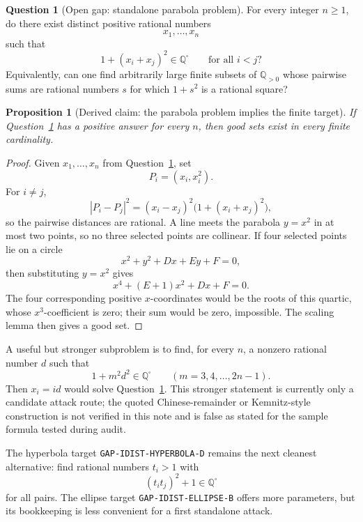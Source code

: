 \documentclass[11pt]{article}
\newtheorem{proposition}[theorem]{Proposition}
\theoremstyle{definition}
\newtheorem{question}[theorem]{Question}
\theoremstyle{remark}
\newcommand{\Q}{\mathbb{Q}}
\newcommand{\Qs}{\Q^{\square}}
\newcommand{\abs}[1]{\left|#1\right|}
\begin{document}
\begin{question}[Open gap: standalone parabola problem]\label{q:missing-e}
For every integer \(n\ge 1\), do there exist distinct positive rational numbers
\[
x_1,\ldots,x_n
\]
such that
\[
1+{(x_i+x_j)}^2\in\Qs
\qquad
\text{for all }i<j?
\]
Equivalently, can one find arbitrarily large finite subsets of \(\Q_{>0}\)
whose pairwise sums are rational numbers \(s\) for which \(1+s^2\) is a rational
square?
\end{question}

\begin{proposition}[Derived claim: the parabola problem implies the finite target]
If Question~\ref{q:missing-e} has a positive answer for every \(n\), then good
sets exist in every finite cardinality.
\end{proposition}

\begin{proof}
Given \(x_1,\ldots,x_n\) from Question~\ref{q:missing-e}, set
\[
P_i=(x_i,x_i^2).
\]
For \(i\ne j\),
\[
\abs{P_i-P_j}^2
={(x_i-x_j)}^2\bigl(1+{(x_i+x_j)}^2\bigr),
\]
so the pairwise distances are rational.  A line meets the parabola \(y=x^2\) in
at most two points, so no three selected points are collinear.  If four selected
points lie on a circle
\[
x^2+y^2+Dx+Ey+F=0,
\]
then substituting \(y=x^2\) gives
\[
x^4+(E+1)x^2+Dx+F=0.
\]
The four corresponding positive \(x\)-coordinates would be the roots of this
quartic, whose \(x^3\)-coefficient is zero; their sum would be zero, impossible.
The scaling lemma then gives a good set.
\end{proof}

A useful but stronger subproblem is to find, for every \(n\), a nonzero rational
number \(d\) such that
\[
1+m^2d^2\in\Qs
\qquad (m=3,4,\ldots,2n-1).
\]
Then \(x_i=id\) would solve Question~\ref{q:missing-e}.  This stronger statement
is currently only a candidate attack route; the quoted Chinese-remainder or
Kemnitz-style construction is not verified in this note and is false as stated
for the sample formula tested during audit.

The hyperbola target \texttt{GAP-IDIST-HYPERBOLA-D} remains the next cleanest
alternative: find rational numbers \(t_i>1\) with
\[
{(t_i t_j)}^2+1\in\Qs
\]
for all pairs.  The ellipse target \texttt{GAP-IDIST-ELLIPSE-B} offers more
parameters, but its bookkeeping is less convenient for a first standalone
attack.
\end{document}
